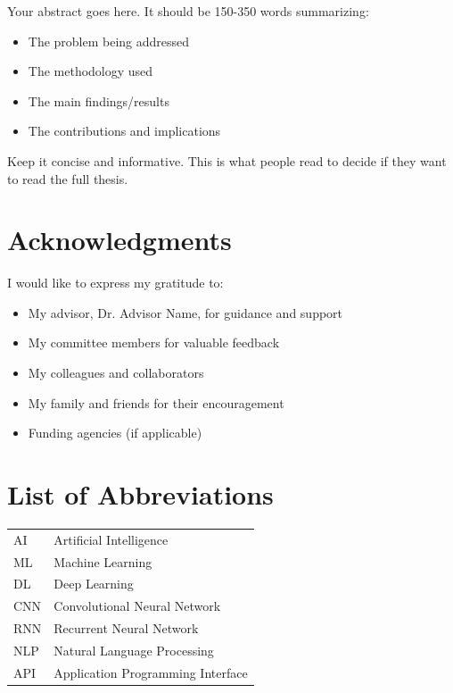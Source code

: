 \documentclass[12pt]{report}
\theoremstyle{dissertation}
\newtheorem theorem}{Theorem}
\newtheorem definition}{Definition}
\newtheorem lemma}{Lemma}
\newtheorem proposition}{Proposition}
\newtheorem corollary}{Corollary}
\begin{document}
\vspace{1cm}

\begin{singlespace}
Your abstract goes here. It should be 150-350 words summarizing:
\begin{itemize}
  \item The problem being addressed
  \item The methodology used
  \item The main findings/results
  \item The contributions and implications
\end{itemize}
Keep it concise and informative. This is what people read to decide if they want to read the full thesis.
\end{singlespace}

\clearpage

\chapter*{Acknowledgments}

I would like to express my gratitude to:

\begin{itemize}
  \item My advisor, Dr. Advisor Name, for guidance and support
  \item My committee members for valuable feedback
  \item My colleagues and collaborators
  \item My family and friends for their encouragement
  \item Funding agencies (if applicable)
\end{itemize}

\clearpage

\tableofcontents

\listoftables

\listoffigures

\listofalgorithms

\chapter*{List of Abbreviations}
\begin{tabular}{ll}
AI & Artificial Intelligence \\
ML & Machine Learning \\
DL & Deep Learning \\
CNN & Convolutional Neural Network \\
RNN & Recurrent Neural Network \\
NLP & Natural Language Processing \\
API & Application Programming Interface \\
\end{tabular}
\end{document}
